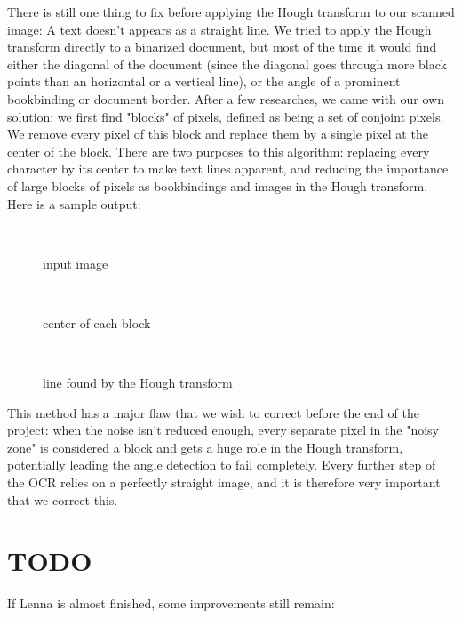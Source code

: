 There is still one thing to fix before applying the Hough transform to our
scanned image: A text doesn't appears as a straight line. We tried to apply the
Hough transform directly to a binarized document, but most of the time it would
find either the diagonal of the document (since the diagonal goes through more
black points than an horizontal or a vertical line), or the angle of a prominent
bookbinding or document border. After a few researches, we came with our own
solution: we first find "blocks" of pixels, defined as being a set of conjoint
pixels. We remove every pixel of this block and replace them by a single pixel
at the center of the block. There are two purposes to this algorithm: replacing
every character by its center to make text lines apparent, and reducing the
importance of large blocks of pixels as bookbindings and images in the Hough
transform. Here is a sample output:\\

\begin{figure}[h!]\
    \centering
    \caption{input image}
\end{figure}
\begin{figure}[h!]\
    \centering
    \caption{center of each block}
\end{figure}
\begin{figure}[h!]\
    \centering
    \caption{line found by the Hough transform}
\end{figure}

This method has a major flaw that we wish to correct before the end of the
project: when the noise isn't reduced enough, every separate pixel in the
"noisy zone" is considered a block and gets a huge role in the Hough transform,
potentially leading the angle detection to fail completely. Every further step
of the OCR relies on a perfectly straight image, and it is therefore very
important that we correct this. \\

\section{TODO}

If Lenna is almost finished, some improvements still remain:

